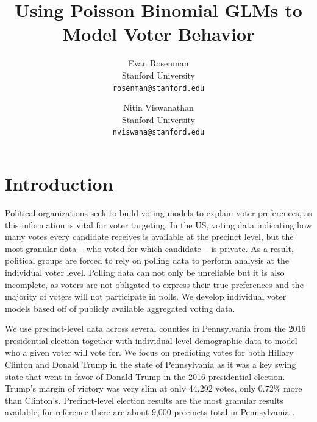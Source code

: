 \documentclass[10pt, letterpaper]{article}
\begin{document}
\title{Using Poisson Binomial GLMs to Model Voter Behavior}

\author{Evan Rosenman\\
Stanford University\\
{\tt\small rosenman@stanford.edu}
\and
Nitin Viswanathan\\
Stanford University\\
{\tt\small nviswana@stanford.edu}
}

\maketitle


\section{Introduction}
Political organizations seek to build voting models to explain voter preferences, as this information is vital for voter targeting. In the US, voting data indicating how many votes every candidate receives is available at the precinct level, but the most granular data – who voted for which candidate – is private. As a result, political groups are forced to rely on polling data to perform analysis at the individual voter level. Polling data can not only be unreliable but it is also incomplete, as voters are not obligated to express their true preferences and the majority of voters will not participate in polls. We develop individual voter models based off of publicly available aggregated voting data.

We use precinct-level data across several counties in Pennsylvania from the 2016 presidential election together with individual-level demographic data to model who a given voter will vote for. We focus on predicting votes for both Hillary Clinton and Donald Trump in the state of Pennsylvania as it was a key swing state that went in favor of Donald Trump in the 2016 presidential election. Trump's margin of victory was very slim at only 44,292 votes, only 0.72\% more than Clinton's\cite{NYT}. Precinct-level election results are the most granular results available; for reference there are about 9,000 precincts total in Pennsylvania \cite{NYT}. 
\end{document}

